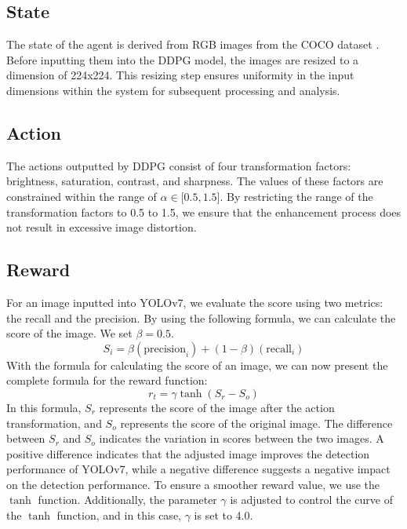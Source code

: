 \documentclass{PHlab-thesis}
\begin{document}
\subsection{State}
The state of the agent is derived from RGB images from the COCO dataset \cite{lin2014microsoft}. Before inputting them into the DDPG model, the images are resized to a dimension of 224x224. This resizing step ensures uniformity in the input dimensions within the system for subsequent processing and analysis.

\subsection{Action}
The actions outputted by DDPG consist of four transformation factors: brightness, saturation, contrast, and sharpness. The values of these factors are constrained within the range of $\alpha\in\lbrack0.5,1.5\rbrack$. By restricting the range of the transformation factors to 0.5 to 1.5, we ensure that the enhancement process does not result in excessive image distortion.

\subsection{Reward}
For an image inputted into YOLOv7, we evaluate the score using two metrics: the recall and the precision. By using the following formula, we can calculate the score of the image. We set $\beta=0.5$.
\begin{equation*}
S_i=\beta({\text{precision}}_i)+(1-\beta)({\text{recall}}_i)
\end{equation*}
With the formula for calculating the score of an image, we can now present the complete formula for the reward function:
\begin{equation*}
r_t={\gamma\tanh(S_r-S_o)}
\end{equation*}
In this formula, $S_r$ represents the score of the image after the action transformation, and $S_o$ represents the score of the original image. The difference between $S_r$ and $S_o$ indicates the variation in scores between the two images. A positive difference indicates that the adjusted image improves the detection performance of YOLOv7, while a negative difference suggests a negative impact on the detection performance. To ensure a smoother reward value, we use the $\tanh$ function. Additionally, the parameter $\gamma$ is adjusted to control the curve of the $\tanh$ function, and in this case, $\gamma$ is set to 4.0.
\end{document}
